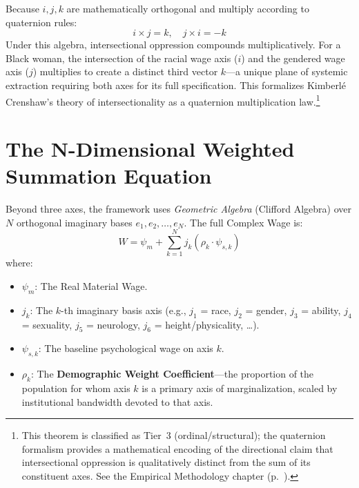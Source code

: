 \begin{theorem}
Because $i, j, k$ are mathematically orthogonal and multiply according to quaternion rules:
\begin{equation}\label{eq:ga.misogynoir}
i \times j = k, \quad j \times i = -k
\end{equation}
Under this algebra, intersectional oppression compounds multiplicatively. For a Black woman, the intersection of the racial wage axis ($i$) and the gendered wage axis ($j$) multiplies to create a distinct third vector $k$---a unique plane of systemic extraction requiring both axes for its full specification. This formalizes Kimberl\'e Crenshaw's theory of intersectionality as a quaternion multiplication law.\footnote{This theorem is classified as Tier~3 (ordinal/structural); the quaternion formalism provides a mathematical encoding of the directional claim that intersectional oppression is qualitatively distinct from the sum of its constituent axes. See the Empirical Methodology chapter (p.~\pageref{ch:empirical_methodology}).}
\end{theorem}

\section{The N-Dimensional Weighted Summation Equation}

Beyond three axes, the framework uses \emph{Geometric Algebra} (Clifford Algebra) over $N$ orthogonal imaginary bases $e_1, e_2, \ldots, e_N$. The full Complex Wage is:
\begin{equation}\label{eq:ga.ndim-allocation}
W = \psi_m + \sum_{k=1}^{N} j_k \left(\rho_k \cdot \psi_{s,k}\right)
\end{equation}
where:
\begin{itemize}
\item $\psi_m$: The Real Material Wage.
\item $j_k$: The $k$-th imaginary basis axis (e.g., $j_1$ = race, $j_2$ = gender, $j_3$ = ability, $j_4$ = sexuality, $j_5$ = neurology, $j_6$ = height/physicality, \ldots).
\item $\psi_{s,k}$: The baseline psychological wage on axis $k$.
\item $\rho_k$: The \textbf{Demographic Weight Coefficient}---the proportion of the population for whom axis $k$ is a primary axis of marginalization, scaled by institutional bandwidth devoted to that axis.
\end{itemize}

